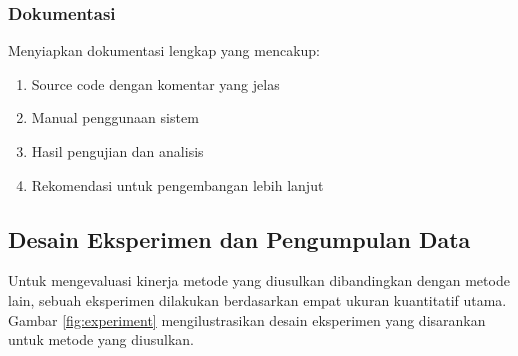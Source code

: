 \documentclass{ittelkom}
\begin{document}
\subsubsection{Dokumentasi}

Menyiapkan dokumentasi lengkap yang mencakup:

\begin{enumerate}
    \item Source code dengan komentar yang jelas
    \item Manual penggunaan sistem
    \item Hasil pengujian dan analisis
    \item Rekomendasi untuk pengembangan lebih lanjut
\end{enumerate}

\subsection{Desain Eksperimen dan Pengumpulan Data}

Untuk mengevaluasi kinerja metode yang diusulkan dibandingkan dengan metode
lain, sebuah eksperimen dilakukan berdasarkan empat ukuran kuantitatif utama.
Gambar \ref{fig:experiment} mengilustrasikan desain eksperimen yang disarankan
untuk metode yang diusulkan.








\end{document}
